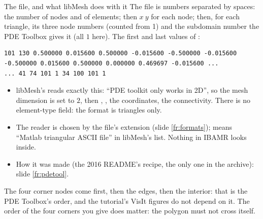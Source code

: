 \documentclass[aspectratio=169,11pt]{beamer}
\begin{document}
\begin{frame}[fragile]{The  file, and what libMesh does with it}
\label{fr:matfile}
\footnotesize
The file is numbers separated by spaces: the number of nodes and of elements; then $x\ y$ for each node; then, for each triangle, its three node numbers (counted from 1) and the subdomain number the PDE Toolbox gives it (all $1$ here). The first and last values of :
\begin{lstlisting}[style=data]
101 130 0.500000 0.015600 0.500000 -0.015600 -0.500000 -0.015600 -0.500000 0.015600 0.500000 0.000000 0.469697 -0.015600 ...
... 41 74 101 1 34 100 101 1
\end{lstlisting}
\begin{itemize}
  \item libMesh's  reads exactly this: ``PDE toolkit only works in 2D'', so the mesh dimension is set to $2$, then , , the coordinates, the connectivity. There is no element-type field: the format is triangles only.
  \item The reader is chosen by the file's extension (slide \ref{fr:formats});  means ``Matlab triangular ASCII file'' in libMesh's list. Nothing in IBAMR looks inside.
  \item How it was made (the 2016 README's recipe, the only one in the archive): slide \ref{fr:pdetool}.
\end{itemize}
\begin{punchbox}
\footnotesize The four corner nodes come first, then the edges, then the interior: that is the PDE Toolbox's order, and the tutorial's VisIt figures do not depend on it. The order of the four corners you give  does matter: the polygon must not cross itself.
\end{punchbox}
\end{frame}
\end{document}
